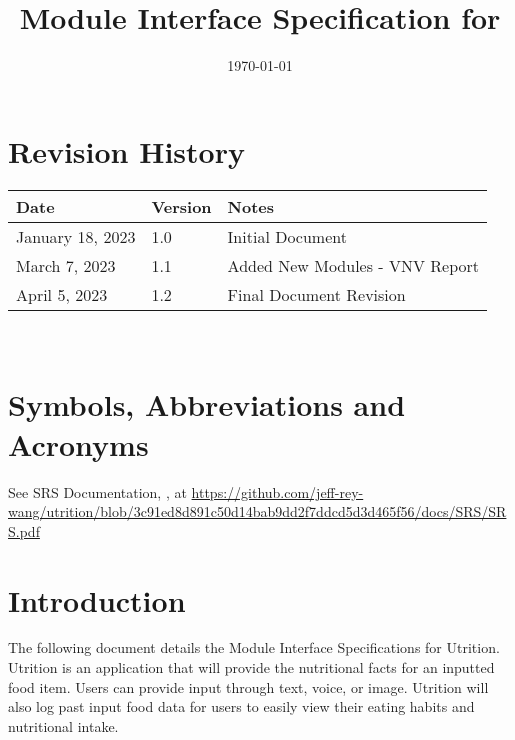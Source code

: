 \documentclass[12pt, titlepage]{article}
\begin{document}
\title{Module Interface Specification for \progname{}}

\author{\authname}

\date{\today}

\maketitle


\section{Revision History}

\begin{tabularx}{\textwidth}{p{3cm}p{2cm}X}
\toprule {\bf Date} & {\bf Version} & {\bf Notes}\\
\midrule
January 18, 2023 & 1.0 & Initial Document\\
March 7, 2023 & 1.1 & Added New Modules - VNV Report\\
April 5, 2023 & 1.2 & Final Document Revision\\
\bottomrule
\end{tabularx}

~\newpage

\section{Symbols, Abbreviations and Acronyms}

See SRS Documentation, \cite{SRS}, at \url{https://github.com/jeff-rey-wang/utrition/blob/3c91ed8d891c50d14bab9dd2f7ddcd5d3d465f56/docs/SRS/SRS.pdf}


\newpage

\tableofcontents

\newpage


\section{Introduction}

The following document details the Module Interface Specifications for Utrition. Utrition is an application that will provide the nutritional facts for an inputted food item. Users can provide input through text, voice, or image. Utrition will also log past input food data for users to easily view their eating habits and nutritional intake.
\end{document}
